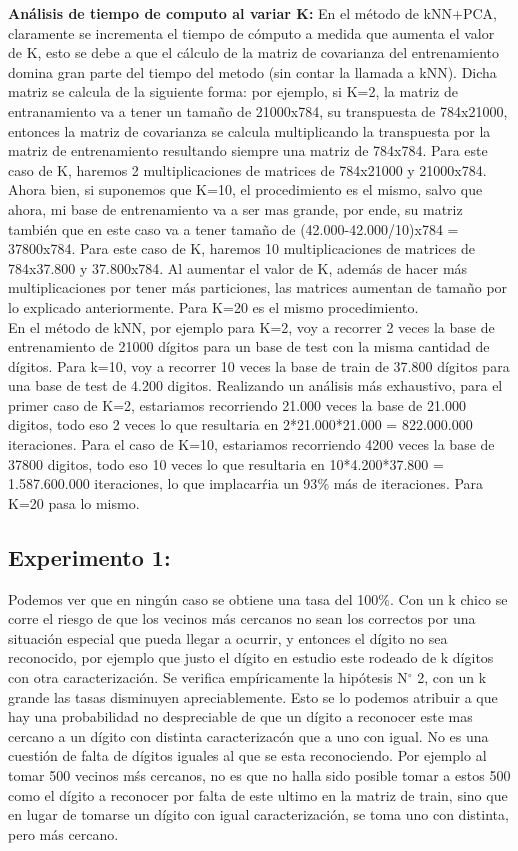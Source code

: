 \textbf{Análisis de tiempo de computo al variar K:}
 En el método de kNN+PCA, claramente se incrementa el tiempo de cómputo a medida que aumenta el valor de K, esto se debe a que el cálculo de la matriz de covarianza del entrenamiento domina gran parte del tiempo del metodo (sin contar la llamada a kNN). Dicha matriz se calcula de la siguiente forma: por ejemplo, si K=2, la matriz de entranamiento va a tener un tamaño de 21000x784, su transpuesta de 784x21000, entonces la matriz de covarianza se calcula multiplicando la transpuesta por la matriz de entrenamiento resultando siempre una matriz de 784x784. Para este caso de K, haremos 2 multiplicaciones de matrices de 784x21000 y 21000x784. Ahora bien, si suponemos que K=10, el procedimiento es el mismo, salvo que ahora, mi base de entrenamiento va a ser mas grande, por ende, su matriz también que en este caso va a tener tamaño de (42.000-42.000/10)x784 = 37800x784. Para este caso de K, haremos 10 multiplicaciones de matrices de 784x37.800 y 37.800x784. Al aumentar el valor de K, además de hacer más multiplicaciones por tener más particiones, las matrices aumentan de tamaño por lo explicado anteriormente. Para K=20 es el mismo procedimiento.\\
En el método de kNN, por ejemplo para K=2, voy a recorrer 2 veces la base de entrenamiento de 21000 dígitos para un base de test con la misma cantidad de dígitos. Para k=10, voy a recorrer 10 veces la base de train de 37.800 dígitos para una base de test de 4.200 digitos. Realizando un análisis más exhaustivo, para el primer caso de K=2, estariamos recorriendo 21.000 veces la base de 21.000 digitos, todo eso 2 veces lo que resultaria en 2*21.000*21.000 = 822.000.000 iteraciones. Para el caso de K=10, estariamos recorriendo 4200 veces la base de 37800 digitos, todo eso 10 veces lo que resultaria en 10*4.200*37.800 = 1.587.600.000 iteraciones, lo que implacarŕia un 93$\%$ más de iteraciones. Para K=20 pasa lo mismo.\\

 \subsection{Experimento 1:}

Podemos ver que en ningún caso se obtiene una tasa del 100$ \% $. Con un k chico se corre el riesgo de que los vecinos más cercanos no sean los correctos por una situación especial que pueda llegar a ocurrir, y entonces el dígito no sea reconocido, por ejemplo que justo el dígito en estudio este rodeado de k dígitos con otra caracterización. Se verifica empíricamente la hipótesis N$ ^{\circ} $ 2, con un k grande las tasas disminuyen apreciablemente. Esto se lo podemos atribuir a que hay una probabilidad no despreciable de que un dígito a reconocer este mas cercano a un dígito con distinta caracterizacón que a uno con igual. No es una cuestión de falta de dígitos iguales al que se esta reconociendo. Por ejemplo al tomar 500 vecinos mśs cercanos, no es que no halla sido posible tomar a estos 500 como el dígito a reconocer por falta de este ultimo en la matriz de train, sino que en lugar de tomarse un dígito con igual caracterización, se toma uno con distinta, pero más cercano.

